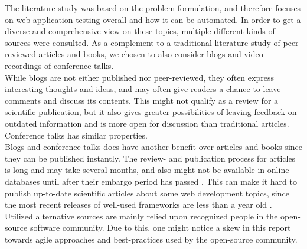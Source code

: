
The literature study was based on the problem formulation, and therefore
focuses on web application testing overall and how it can be automated.
In order to get a diverse and comprehensive view on these topics,
multiple different kinds of sources were consulted. As a
complement to a traditional literature study of peer-reviewed articles
and books, we chosen to also consider blogs and video recordings of
conference talks.\\

While blogs are not either published nor peer-reviewed, they often
express interesting thoughts and ideas, and may often give readers a
chance to leave comments and discuss its contents. This might not
qualify as a review for a scientific publication, but it also gives
greater possibilities of leaving feedback on outdated information and
is more open for discussion than traditional articles. Conference
talks has similar properties.\\

Blogs and conference talks does have another benefit over articles and
books since they can be published instantly. The review- and publication
process for articles is long and may take several months, and also might
not be available in online databases until after their embargo period
has passed \cite{wiki:embargo, pdf:publishing}. This can make it hard to
publish up-to-date scientific articles about some web development
topics, since the most recent releases of well-used frameworks are less
than a year old \cite{wiki:rails_versions, wiki:django_versions,
web:knockout_versions}.\\

Utilized alternative sources are mainly relied upon recognized people in
the open-source software community. Due to this, one might notice a skew
in this report towards agile approaches and best-practices used by the
open-source community.\\

